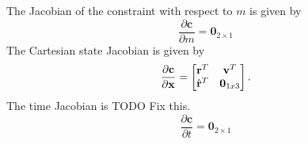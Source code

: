 %
The Jacobian of the constraint with respect to $m$ is given by
\begin{equation}
\frac{\partial \mathbf{c}}{\partial m} =
\mathbf{0}_{2 \times 1}
\end{equation}
%
The Cartesian state Jacobian is given by
\begin{equation}
\frac{\partial \mathbf{c}}{\partial \mathbf{x}} = \begin{bmatrix}
   \mathbf{r}^T & \mathbf{v}^T \\
   \hat{\mathbf{r}}^T & \mathbf{0}_{1x3}\\
\end{bmatrix}.
\end{equation}
%
The time Jacobian is TODO Fix this.
%
\begin{equation}
\frac{\partial \mathbf{c}}{\partial t} = \mathbf{0}_{2 \times 1}
\end{equation}
%


